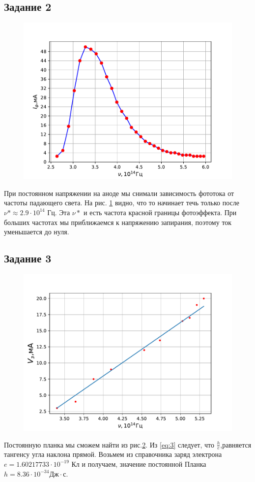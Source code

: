 \subsection{Задание 2}
\begin{figure}[H]
	\centering
	\includegraphics[scale=0.8]{scripts/n2}
	\caption{}
	\label{fig:6}
\end{figure}
При постоянном напряжении на аноде мы снимали зависимость фототока от частоты падающего света. На рис. \ref{fig:6} видно, что то начинает течь только после $\nu*\approx 2.9\cdot10^{14}$ Гц. Эта $\nu*$ и есть частота красной границы фотоэффекта. 
При больших частотах мы приближаемся к напряжению запирания, поэтому ток уменьшается до нуля. 
\subsection{Задание 3}
\begin{figure}[H]
	\centering
	\includegraphics[scale=0.8]{scripts/n3}
	\caption{}
	\label{fig:7}
\end{figure}
Постоянную планка мы сможем найти из рис.\ref{fig:7}. Из \ref{eq:3} следует, что $\frac he$,равняется тангенсу угла наклона прямой. Возьмем из справочника заряд электрона $ e=1.60217733\cdot10^{-19}$ Кл и получаем, значение постоянной Планка $h=8.36\cdot10^{-34}\text{Дж}\cdot\text{с}$.


